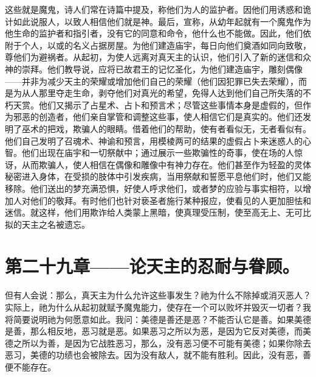 这些就是魔鬼，诗人们常在诗篇中提及，称他们为人的监护者。因他们用诱惑和诡计如此说服人，以致人相信他们就是神。最后，宣称，从幼年起就有一个魔鬼作为他生命的监护者和指引者，没有它的同意和命令，他什么也不能做。因此，他们依附于个人，以或的名义占据房屋。为他们建造庙宇，每日向他们奠酒如同向致敬，尊他们为避祸者。从起初，为使人远离对真天主的认识，他们引入了新的迷信和众神的崇拜。他们教导说，应将已故君王的记忆圣化，为他们建造庙宇，雕刻偶像——并非为减少天主的荣耀或增加他们自己的荣耀（他们因犯罪已失去荣耀），而是为从人那里夺走生命，剥夺他们对真光的希望，免得人达到他们自己所失落的不朽天赏。他们又揭示了占星术、占卜和预言术；尽管这些事情本身是虚假的，但作为邪恶的创造者，他们亲自掌管和调整这些事，使人相信它们是真实的。他们还发明了巫术的把戏，欺骗人的眼睛。借着他们的帮助，使有者看似无，无者看似有。他们自己发明了召魂术、神谕和预言，用模棱两可的结果的虚假占卜来迷惑人的心智。他们出现在庙宇和一切祭献中；通过展示一些欺骗性的奇事，使在场的人惊讶，从而欺骗人，使人相信在偶像和雕像中有神力存在。他们甚至作为轻盈的灵体秘密进入身体，在受损的肢体中引发疾病，当用祭献和誓愿平息他们时，他们又能移除。他们送出的梦充满恐惧，好使人呼求他们，或者梦的应验与事实相符，以增加人对他们的敬拜。有时他们也针对亵圣者施行某种报应，使看见的人更加胆怯和迷信。就这样，他们用欺诈给人类蒙上黑暗，使真理受压制，使至高无上、无可比拟的天主之名被遗忘。\par


\section{第二十九章——论天主的忍耐与眷顾。}

但有人会说：那么，真天主为什么允许这些事发生？祂为什么不除掉或消灭恶人？实际上，祂为什么从起初就赋予魔鬼能力，使存在一个可以败坏并毁灭一切者？我将简要说明祂为何愿意如此。我问：美德是善还是恶？不能否认它是善。如果美德是善，那么相反地，恶习就是恶。如果恶习之所以为恶，是因为它反对美德，而美德之所以为善，是因为它战胜恶习，那么，没有恶习便不可能有美德；如果你除去恶习，美德的功绩也会被除去。因为没有敌人，就不能有胜利。因此，没有恶，善便不能存在。\par

